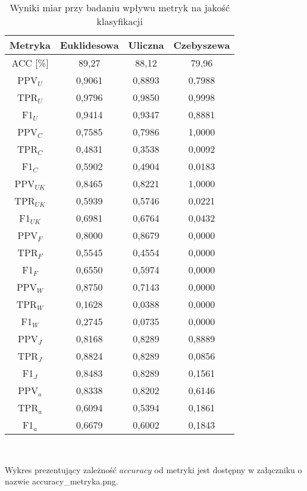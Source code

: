 \documentclass{article}
\begin{document}
\begin{table}[H]
    \centering
    \begin{tabular}{|c|c|c|c|}
    \hline
    \textbf{Metryka} & \textbf{Euklidesowa} & \textbf{Uliczna} & \textbf{Czebyszewa}  \\ \hline
    ACC [\%] & 89,27 & 88,12 & 79,96\\ \hline
    PPV\(_U\) & 0,9061 & 0,8893 & 0,7988\\ \hline
    TPR\(_U\) & 0,9796& 0,9850 & 0,9998\\ \hline
    F1\(_U\)  & 0,9414& 0,9347 & 0,8881\\ \hline
    PPV\(_C\) & 0,7585& 0,7986 & 1,0000\\ \hline
    TPR\(_C\) &  0,4831& 0,3538 & 0,0092\\ \hline
    F1\(_C\) & 0,5902& 0,4904 & 0,0183\\ \hline
    PPV\(_{UK}\) & 0,8465& 0,8221 & 1,0000\\ \hline
    TPR\(_{UK}\) & 0,5939& 0,5746 & 0,0221\\ \hline
    F1\(_{UK}\) & 0,6981& 0,6764 & 0,0432\\ \hline
    PPV\(_F\) & 0,8000& 0,8679 & 0,0000\\ \hline
    TPR\(_F\) & 0,5545& 0,4554 & 0,0000\\ \hline
    F1\(_F\) & 0,6550& 0,5974 & 0,0000\\ \hline
    PPV\(_W\) & 0,8750& 0,7143 & 0,0000\\ \hline
    TPR\(_W\) & 0,1628& 0,0388 & 0,0000\\ \hline
    F1\(_W\) & 0,2745& 0,0735 & 0,0000\\ \hline
    PPV\(_J\) & 0,8168& 0,8289 & 0,8889\\ \hline
    TPR\(_J\) & 0,8824& 0,8289 & 0,0856\\ \hline
    F1\(_J\) & 0,8483 & 0,8289 & 0,1561\\ \hline
    PPV\(_a\) & 0,8338 & 0,8202 & 0,6146\\ \hline
    TPR\(_a\) &  0,6094 & 0,5394 & 0,1861\\ \hline
    F1\(_a\) & 0,6679 & 0,6002 & 0,1843\\ \hline
    \end{tabular}
    \caption{Wyniki miar przy badaniu wpływu metryk na jakość klasyfikacji}
\end{table}\

Wykres prezentujący zależność \(accuracy\) od metryki jest dostępny w załączniku o nazwie accuracy\_metryka.png.
\end{document}
